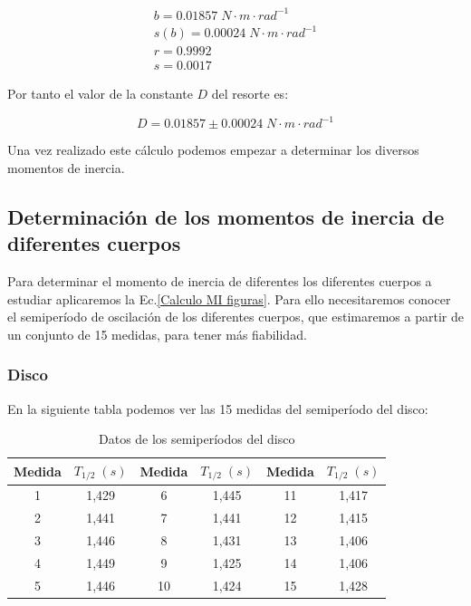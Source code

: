 \documentclass[a4paper,12pt,titlepage]{article}
\begin{document}
\begin{equation}
    \begin{gathered}
        b = 0.01857 \; N\cdot m \cdot rad^{-1}\\
        s(b) =  0.00024 \; N\cdot m \cdot rad^{-1}\\
        r =  0.9992 \\
        s =  0.0017
    \end{gathered}
\end{equation}

Por tanto el valor de la constante $D$ del resorte es:

\begin{equation}
    D = 0.01857 \pm 0.00024 \; N\cdot m \cdot rad^{-1}
\end{equation}

Una vez realizado este cálculo podemos empezar a determinar los diversos momentos de inercia.

\subsection{Determinación de los momentos de inercia de diferentes cuerpos}

Para determinar el momento de inercia de diferentes los diferentes cuerpos a estudiar aplicaremos la Ec.\ref{Calculo MI figuras}. Para ello necesitaremos conocer el semiperíodo de oscilación de los diferentes cuerpos, que estimaremos a partir de un conjunto de 15 medidas, para tener más fiabilidad.

\subsubsection{Disco}

En la siguiente tabla podemos ver las 15 medidas del semiperíodo del disco:

\begin{table}[h!]
    \centering
    \begin{tabular}{|c|c|c|c|c|c|}
    \hline
    Medida  &  $T_{1/2} \; (s)$ & Medida   &   $T_{1/2} \; (s)$    & Medida   &   $T_{1/2} \; (s)$    \\ \hline
    1 & 1,429 & 6  & 1,445 & 11 & 1,417 \\ \hline
    2 & 1,441 & 7  & 1,441 & 12 & 1,415 \\ \hline
    3 & 1,446 & 8  & 1,431 & 13 & 1,406 \\ \hline
    4 & 1,449 & 9  & 1,425 & 14 & 1,406 \\ \hline
    5 & 1,446 & 10 & 1,424 & 15 & 1,428 \\ \hline
    \end{tabular}
    \caption{Datos de los semiperíodos del disco}
    \label{SemiT disco}
\end{table}
\end{document}
